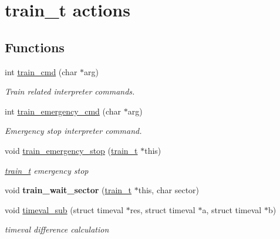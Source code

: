 \hypertarget{group__train__t__actions}{\section{train\-\_\-t actions}
\label{group__train__t__actions}
}
\subsection*{Functions}
\begin{DoxyCompactItemize}
\item 
int \hyperlink{group__train__t__actions_ga67e55a3522e2048fb830b79e10fe6e3e}{train\-\_\-cmd} (char $\ast$arg)
\begin{DoxyCompactList}\small\item\em Train related interpreter commands. \end{DoxyCompactList}\item 
int \hyperlink{group__train__t__actions_gadb4c7fe2bb0d4bb621d5f185d4a01638}{train\-\_\-emergency\-\_\-cmd} (char $\ast$arg)
\begin{DoxyCompactList}\small\item\em Emergency stop interpreter command. \end{DoxyCompactList}\item 
void \hyperlink{group__train__t__actions_gad1e4327e0b58b796ee1a327a01a83994}{train\-\_\-emergency\-\_\-stop} (\hyperlink{structtrain__t}{train\-\_\-t} $\ast$this)
\begin{DoxyCompactList}\small\item\em \hyperlink{structtrain__t}{train\-\_\-t} emergency stop \end{DoxyCompactList}\item 
\hypertarget{group__train__t__actions_gab86ee52704c14c0a3179a41ed607785f}{void {\bfseries train\-\_\-wait\-\_\-sector} (\hyperlink{structtrain__t}{train\-\_\-t} $\ast$this, char sector)}\label{group__train__t__actions_gab86ee52704c14c0a3179a41ed607785f}

\item 
void \hyperlink{group__train__t__actions_ga8057969f4229170fa28ef7b5afb60268}{timeval\-\_\-sub} (struct timeval $\ast$res, struct timeval $\ast$a, struct timeval $\ast$b)
\begin{DoxyCompactList}\small\item\em timeval difference calculation \end{DoxyCompactList}\end{DoxyCompactItemize}



